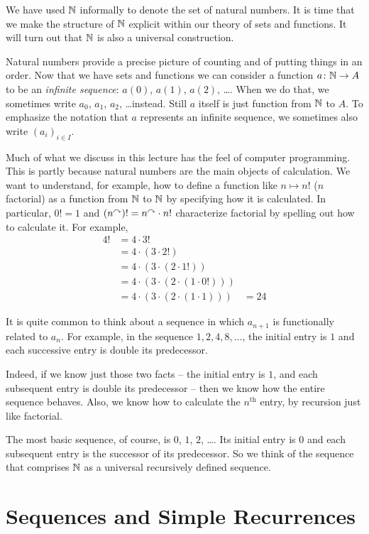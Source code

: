 We have used $\mathbb N$ informally to denote the set of natural numbers. 
It is time that we make the structure of $\mathbb N$ explicit within our theory of sets and functions. 
It will turn out that $\mathbb N$ is also a universal construction. 

Natural numbers provide a precise picture of counting and of putting things in an order.
Now that we have sets and functions we can consider a function ${a}\colon{\mathbb N}\to{A}$ to be an \emph{infinite sequence}: $a(0)$, $a(1)$, $a(2)$, \ldots.
When we do that, we sometimes write $a_0$, $a_1$, $a_2$, \ldots instead.
Still $a$ itself is just function from $\mathbb N$ to $A$.
To emphasize the notation that $a$ represents an infinite sequence, we sometimes also write $(a_i)_{i\in I}$.

Much of what we discuss in this lecture has the feel of computer programming.
This is partly because natural numbers are the main objects of calculation.
We want to understand, for example, how to define a function like $n\mapsto n!$ ($n$ factorial) as a function from $\mathbb N$ to $\mathbb N$ by specifying how it is calculated.
In particular, $0! = 1$ and $(n^\curvearrowright)! = n^\curvearrowright\cdot n!$ characterize factorial by spelling out how to calculate it.
For example,
\begin{align*}
	4!  &= 4 \cdot 3! \\
		&= 4 \cdot (3 \cdot 2!)\\
		&= 4 \cdot (3 \cdot (2 \cdot 1!))\\
		&= 4 \cdot (3 \cdot (2 \cdot (1 \cdot 0!)))\\
		&= 4 \cdot (3 \cdot (2 \cdot (1 \cdot 1)))
		&= 24
\end{align*}

It is quite common to think about a sequence in which $a_{n+1}$ is functionally related to $a_n$. 
For example, in the sequence $1, 2, 4, 8,\ldots$, the initial entry is $1$ and each successive entry is double its predecessor.

Indeed, if we know just those two facts -- the initial entry is $1$, and each subsequent entry is double its predecessor -- then we know how the entire sequence behaves.
Also, we know how to calculate the $n^{\text{th}}$ entry, by recursion just like factorial.

The most basic sequence, of course, is $0$, $1$, $2$, \ldots. 
Its initial entry is $0$ and each subsequent entry is the successor of its predecessor. 
So we think of the sequence that comprises $\mathbb N$ as a universal recursively defined sequence.

\section{Sequences and Simple Recurrences}

